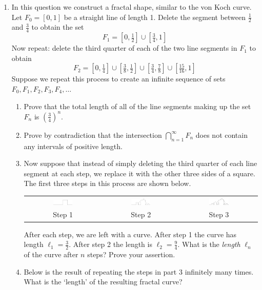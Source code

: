 \begin{enumerate}
	\item In this question we construct a fractal shape, similar to the von Koch curve. Let $F_0=[0,1]$ be a straight line of length 1. Delete the segment between $\frac 12$ and $\frac 34$ to obtain the set
    \[F_1=[0,\tfrac 12]\cup[\tfrac 34,1]\]
    Now repeat: delete the third quarter of each of the two line segments in $F_1$ to obtain
    \[F_2=[0,\tfrac 14]\cup[\tfrac 38,\tfrac 12]\cup[\tfrac 34,\tfrac 78]\cup[\tfrac{15}{16},1]\]
    Suppose we repeat this process to create an infinite sequence of sets $F_0,F_1,F_2,F_3,F_4,\ldots$
  \begin{enumerate}
    \item Prove that the total length of all of the line segments making up the set $F_n$ is $\left(\frac 34\right)^n$.
    \item Prove by contradiction that the intersection $\bigcap\limits_{n=1}^\infty F_n$ does not contain any intervals of positive length.
    \item Now suppose that instead of simply deleting the third quarter of each line segment at each step, we replace it with the other three sides of a square. The first three steps in this process are shown below.
    \begin{center}
    \begin{tabular}{ccc}
    \includegraphics[width=0.27\textwidth]{fractal1}
    &
    \includegraphics[width=0.27\textwidth]{fractal2}
    &
    \includegraphics[width=0.27\textwidth]{fractal3}
   	\\
   	Step 1&Step 2&Step 3
    \end{tabular}
    \end{center}
    After each step, we are left with a curve. After step 1 the curve has length $\ell_1=\frac 32$. After step 2 the length is $\ell_2=\frac 94$. What is the \emph{length} $\ell_n$ of the curve after $n$ steps? Prove your assertion.
    \item Below is the result of repeating the steps in part 3 infinitely many times. What is the `length' of the resulting fractal curve?

\end{enumerate}
\end{enumerate}
